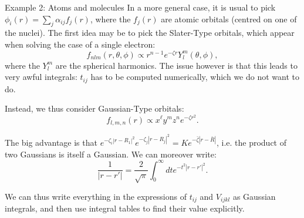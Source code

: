 \documentclass[a4paper]{article}
\begin{document}
\begin{parag}{Example 2: Atoms and molecules}
    In a more general case, it is usual to pick $\phi_i\left(r\right) = \sum_{j} \alpha_{i j} f_j\left(r\right)$, where the $f_j\left(r\right)$ are atomic orbitals (centred on one of the nuclei). The first idea may be to pick the Slater-Type orbitals, which appear when solving the case of a single electron: 
    \[f_{n l m}\left(r, \theta, \phi\right) \propto r^{n-1} e^{-\zeta r} Y_l^m\left(\theta, \phi\right),\]
    where the $Y_l^m$ are the spherical harmonics. The issue however is that this leads to very awful integrals: $t_{ij}$ has to be computed numerically, which we do not want to do.

    Instead, we thus consider Gaussian-Type orbitals: 
    \[f_{l, m, n}\left(r\right) \propto x^\ell y^m z^n e^{-\zeta r^2}.\]

    The big advantage is that $e^{-\zeta_i \left|r - R_1\right|^2} e^{-\zeta_j \left|r - R_j\right|^2} = K e^{- \bar{\zeta} \left|r - \bar{R}\right|}$, i.e. the product of two Gaussians is itself a Gaussian. We can moreover write: 
    \[\frac{1}{\left|r - r'\right|} = \frac{2}{\sqrt{\pi}} \int_{0}^{\infty} dt e^{-t^2 \left|r - r'\right|^2}.\]

    We can thus write everything in the expressions of $t_{ij}$ and $V_{ijkl}$ as Gaussian integrals, and then use integral tables to find their value explicitly.
\end{parag}
\end{document}
